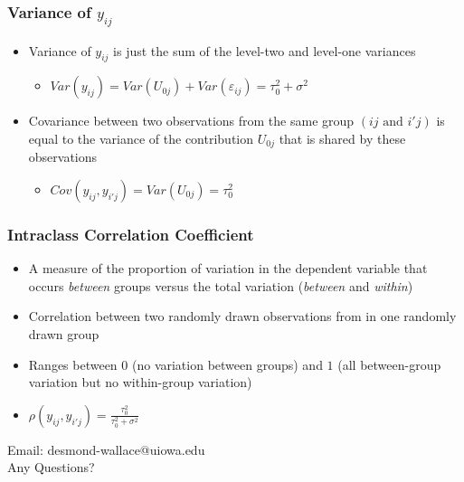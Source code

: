 \documentclass{beamer}
\begin{document}
\begin{frame}
	\frametitle{Variance of $y_{ij}$}
		\begin{itemize}
			\item Variance of  $y_{ij}$ is just the sum of the level-two and level-one variances
				\begin{itemize}
					\item $Var(y_{ij})=Var(U_{0j})+Var(\varepsilon_{ij})=\tau^{2}_{0}+\sigma^2$
				\end{itemize}
			\item Covariance between two observations from the same group $(ij\mbox{ and }i'j)$ is equal to the variance of the contribution $U_{0j}$ that is shared by these observations
				\begin{itemize}
					\item $Cov(y_{ij},y_{i'j})=Var(U_{0j})=\tau^{2}_{0}$
				\end{itemize}
		\end{itemize}
\end{frame}

\begin{frame}
	\frametitle{Intraclass Correlation Coefficient}
		\begin{itemize}
			\item A measure of the proportion of variation in the dependent variable that occurs \textit{between} groups versus the total variation (\textit{between} and \textit{within})
			\item Correlation between two randomly drawn observations from in one randomly drawn group
			\item Ranges between $0$ (no variation between groups) and $1$ (all between-group variation but no within-group variation)
			\item $\rho(y_{ij},y_{i'j})=\frac{\tau^{2}_{0}}{\tau^{2}_{0}+\sigma^2}$
		\end{itemize}
\end{frame}

\begin{frame}
	\begin{center}
		\begin{LARGE}
			Email: desmond-wallace@uiowa.edu\\
			Any Questions?
		\end{LARGE}
	\end{center}
\end{frame}
\end{document}
